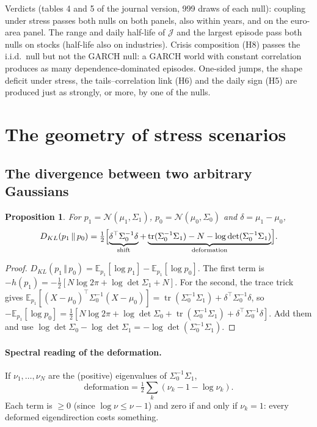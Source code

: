 \documentclass[11pt]{article}
\theoremstyle{plain}
\newtheorem{proposition}{Proposition}[section]
\theoremstyle{definition}
\theoremstyle{remark}
\newcommand{\JJ}{\mathcal{J}}
\newcommand{\E}{\mathbb{E}}
\newcommand{\N}{\mathcal{N}}
\newcommand{\tr}{\operatorname{tr}}
\newcommand{\KL}[2]{D_{KL}\!\left(#1\,\Vert\,#2\right)}
\begin{document}
\begin{papier}
Verdicts (tables 4 and 5 of the journal version, 999 draws of each null):
coupling under stress passes both nulls on both panels, also within years,
and on the euro-area panel. The range and daily half-life of $\JJ$ and the
largest episode pass both nulls on stocks (half-life also on industries).
Crisis composition (H8) passes the i.i.d.\ null but not the GARCH null: a
GARCH world with constant correlation produces as many dependence-dominated
episodes. One-sided jumps, the shape deficit under stress, the
tails--correlation link (H6) and the daily sign (H5) are produced just as
strongly, or more, by one of the nulls.
\end{papier}

\section{The geometry of stress scenarios}
\label{sec:scenarios}

\subsection{The divergence between two arbitrary Gaussians}

\begin{proposition}
\label{prop:klgauss}
For $p_1=\N(\mu_1,\Sigma_1)$, $p_0=\N(\mu_0,\Sigma_0)$ and $\delta=\mu_1-\mu_0$,
\[
\KL{p_1}{p_0}=\tfrac12\Bigl[\underbrace{\delta^\top\Sigma_0^{-1}\delta}_{\text{shift}}
+\underbrace{\tr(\Sigma_0^{-1}\Sigma_1)-N-\log\det(\Sigma_0^{-1}\Sigma_1)}_{\text{deformation}}\Bigr].
\]
\end{proposition}

\begin{proof}
$\KL{p_1}{p_0}=\E_{p_1}[\log p_1]-\E_{p_1}[\log p_0]$. The first term is
$-h(p_1)=-\tfrac12[N\log2\pi+\log\det\Sigma_1+N]$. For the second, the trace
trick gives
$\E_{p_1}[(X-\mu_0)^\top\Sigma_0^{-1}(X-\mu_0)]=\tr(\Sigma_0^{-1}\Sigma_1)
+\delta^\top\Sigma_0^{-1}\delta$, so
$-\E_{p_1}[\log p_0]=\tfrac12[N\log2\pi+\log\det\Sigma_0+\tr(\Sigma_0^{-1}\Sigma_1)
+\delta^\top\Sigma_0^{-1}\delta]$. Add them and use
$\log\det\Sigma_0-\log\det\Sigma_1=-\log\det(\Sigma_0^{-1}\Sigma_1)$.
\end{proof}

\paragraph{Spectral reading of the deformation.} If $\nu_1,\dots,\nu_N$ are
the (positive) eigenvalues of $\Sigma_0^{-1}\Sigma_1$,
\[
\text{deformation}=\tfrac12\sum_k(\nu_k-1-\log\nu_k).
\]
Each term is $\ge0$ (since $\log\nu\le\nu-1$) and zero if and only if
$\nu_k=1$: every deformed eigendirection costs something.
\end{document}
